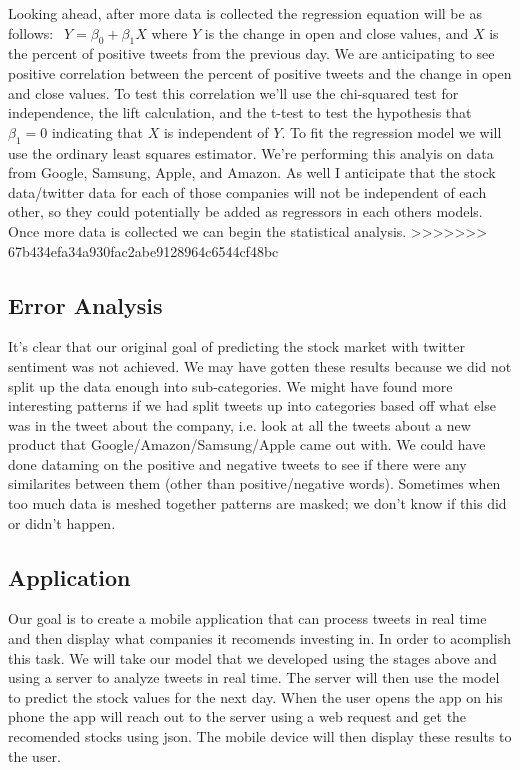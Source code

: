 \documentclass{acm_proc_article-sp}
\begin{document}
\begin{doublespace}
Looking ahead, after more data is collected the regression equation will be as
follows: $ \ \ Y = \beta_0 + \beta_1X $ where $Y$ is the change in open and
close values, and $X$ is the percent of positive tweets from the previous day.
We are anticipating to see positive correlation between the percent of positive
tweets and the change in open and close values. To test this correlation we'll
use the chi-squared test for independence, the lift calculation, and the t-test
to test the hypothesis that $\beta_1 = 0$ indicating that $X$ is independent of
$Y$. To fit the regression model we will use the ordinary least squares
estimator. We're performing this analyis on data from Google, Samsung, Apple,
and Amazon. As well I anticipate that the stock data/twitter data for each of
those companies will not be independent of each other, so they could
potentially be added as regressors in each others models. Once more data is
collected we can begin the statistical analysis. 
>>>>>>> 67b434efa34a930fac2abe9128964c6544cf48bc


\subsection{Error Analysis}

It's clear that our original goal of predicting the stock market with twitter sentiment 
was not achieved. We may have gotten these results because we did not split up the data 
enough into sub-categories. We might have found more interesting patterns if we had split tweets
up into categories based off what else was in the tweet about the company, i.e. look at all the
tweets about a new product that Google/Amazon/Samsung/Apple came out with. We could have done dataming
on the positive and negative tweets to see if there were any similarites between them (other 
than positive/negative words). Sometimes when too much data is meshed together patterns are masked;
we don't know if this did or didn't happen. 

\subsection{Application}

Our goal is to create a mobile application that can process tweets in real time
and then display what companies it recomends investing in. In order to
acomplish this task. We will take our model that we developed using the stages
above and using a server to analyze tweets in real time. The server will then
use the model to predict the stock values for the next day. When the user opens
the app on his phone the app will reach out to the server using a web request
and get the recomended stocks using json. The mobile device will then display
these results to the user.


\end{doublespace}
\end{document}
